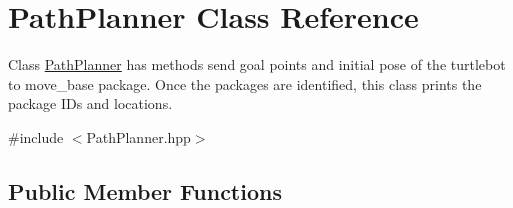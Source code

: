 \hypertarget{classPathPlanner}{}\section{Path\+Planner Class Reference}
\label{classPathPlanner}


Class \hyperlink{classPathPlanner}{Path\+Planner} has methods send goal points and initial pose of the turtlebot to move\+\_\+base package. Once the packages are identified, this class prints the package I\+Ds and locations.  




{\ttfamily \#include $<$Path\+Planner.\+hpp$>$}

\subsection*{Public Member Functions}
